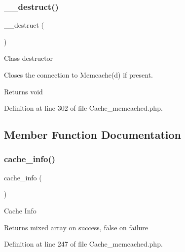 \mbox{\label{class_c_i___cache__memcached_a421831a265621325e1fdd19aace0c758}} 
\subsubsection{\texorpdfstring{\_\_destruct()}{\_\_destruct()}}
{\footnotesize\ttfamily \+\_\+\+\_\+destruct (\begin{DoxyParamCaption}{ }\end{DoxyParamCaption})}

Class destructor

Closes the connection to Memcache(d) if present.

\begin{DoxyReturn}{Returns}
void 
\end{DoxyReturn}


Definition at line 302 of file Cache\+\_\+memcached.\+php.



\subsection{Member Function Documentation}
\mbox{\label{class_c_i___cache__memcached_acb4742926a6fa901e4f0917e1a35ef4c}} 
\subsubsection{\texorpdfstring{cache\_info()}{cache\_info()}}
{\footnotesize\ttfamily cache\+\_\+info (\begin{DoxyParamCaption}{ }\end{DoxyParamCaption})}

Cache Info

\begin{DoxyReturn}{Returns}
mixed array on success, false on failure 
\end{DoxyReturn}


Definition at line 247 of file Cache\+\_\+memcached.\+php.

\mbox{\label{class_c_i___cache__memcached_adb40b812890a8bc058bf6b7a0e1a54d9}} 
